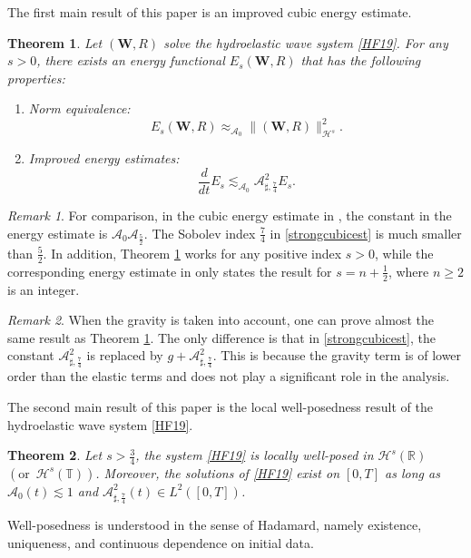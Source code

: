 \documentclass[10pt]{amsart}
\newtheorem{theorem}{Theorem}[section]
\theoremstyle{remark}
\newtheorem{remark}{Remark}[section]
\theoremstyle{definition}
\numberwithin{equation}{section}
\renewcommand{\H}{{\mathcal H }}
\newcommand{\f}{\frac}
\newcommand{\bw}{\mathbf{W}}
\newcommand{\CalAZ}{{\mathcal{A}_0}}
\newcommand{\ASSharp}{{\mathcal{A}_{\sharp,\frac{7}{4}}^2}}
\begin{document}
The first main result of this paper is an improved cubic energy estimate. 
\begin{theorem} \label{t:MainEnergyEst}
 Let $(\bw, R)$ solve the hydroelastic wave system \eqref{HF19}.
 For any $s> 0$, there exists an energy functional $E_s(\bw, R)$ that has the following properties:
 \begin{enumerate}
     \item Norm equivalence:
       \begin{equation}
           E_s(\mathbf{W},R) \approx_\CalAZ \|(\bw,  R)\|^2_{\mathcal{H}^s}.\label{normEquivalence}
       \end{equation}
     \item Improved energy estimates:
      \begin{equation}
     \frac{d}{dt}E_s\lesssim_\CalAZ \ASSharp  E_s.\label{strongcubicest}
 \end{equation} 
 \end{enumerate} 
\end{theorem}

\begin{remark}
For comparison, in the cubic energy estimate in \cite{MR4846707}, the constant in the energy estimate is $\CalAZ\mathcal{A}_{\f52}$.
The Sobolev index $\f74$ in \eqref{strongcubicest} is much smaller than $\f52$.
In addition, Theorem \ref{t:MainEnergyEst} works for any positive index $s>0$, while the corresponding energy estimate in \cite{MR4846707} only states the result for $s= n+\f12$, where $n\geq 2$ is an integer.
\end{remark}
\begin{remark}
When the gravity is taken into account, one can prove almost the same result as Theorem \ref{t:MainEnergyEst}.
The only difference is that in \eqref{strongcubicest}, the constant $\ASSharp$ is replaced by $g+\ASSharp$.
This is because the gravity term is of lower order than the elastic terms and does not play a significant role in the analysis.
\end{remark}
	
The second main result of this paper is the local well-posedness result of the hydroelastic wave system \eqref{HF19}.

\begin{theorem} \label{t:HydroWellPosed}
Let $s> \f34$, the system \eqref{HF19} is locally well-posed  in $\H^s(\mathbb{R})$ $(\text{or }\, \H^s(\mathbb{T}) )$.
Moreover, the solutions of \eqref{HF19} exist on $[0,T]$ as long as $\mathcal{A}_0(t) \lesssim 1$ and $\ASSharp(t) \in L^2([0,T])$.
\end{theorem}
Well-posedness is understood in the sense of Hadamard, namely existence, uniqueness, and continuous dependence on initial data.
\end{document}
